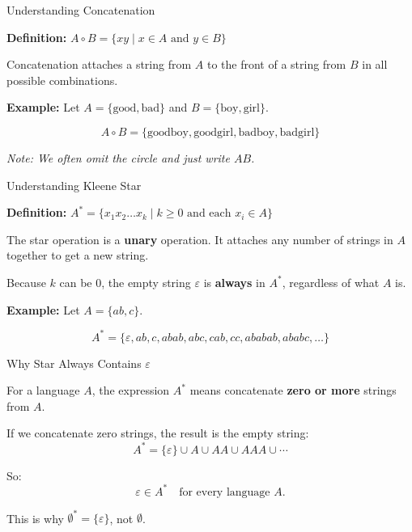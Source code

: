 \documentclass[10pt,aspectratio=169]{beamer}
\newcommand{\eps}{\varepsilon}
\begin{document}
\begin{frame}{Understanding Concatenation}

\textbf{Definition:} $A \circ B = \{xy \mid x \in A \text{ and } y \in B\}$

\vspace{1em}

Concatenation attaches a string from $A$ to the front of a string from $B$ in all possible combinations.

\vspace{1em}

\textbf{Example:}
Let $A = \{\text{good}, \text{bad}\}$ and $B = \{\text{boy}, \text{girl}\}$.

\vspace{0.5em}
$$A \circ B = \{\text{goodboy}, \text{goodgirl}, \text{badboy}, \text{badgirl}\}$$

\vspace{1em}
\pause
\textit{Note: We often omit the circle and just write $AB$.}

\end{frame}

\begin{frame}{Understanding Kleene Star}

\textbf{Definition:} $A^* = \{x_1x_2\dots x_k \mid k \geq 0 \text{ and each } x_i \in A\}$

\vspace{1em}

The star operation is a \textbf{unary} operation. It attaches any number of strings in $A$ together to get a new string.

\vspace{0.5em}
Because $k$ can be $0$, the empty string $\eps$ is \textbf{always} in $A^*$, regardless of what $A$ is.

\vspace{1em}

\textbf{Example:}
Let $A = \{ab, c\}$.

$$A^* = \{\eps, ab, c, abab, abc, cab, cc, ababab, ababc, \dots\}$$

\end{frame}


\begin{frame}{Why Star Always Contains $\eps$}

For a language $A$, the expression $A^*$ means concatenate \textbf{zero or more} strings from $A$.

\vspace{0.8em}
If we concatenate zero strings, the result is the empty string:
\[
A^* = \{\eps\} \cup A \cup AA \cup AAA \cup \cdots
\]

\vspace{0.8em}
So:
\[
\eps \in A^* \quad \text{for every language } A.
\]

\pause
\vspace{0.6em}
This is why $\emptyset^* = \{\eps\}$, not $\emptyset$.

\end{frame}
\end{document}
